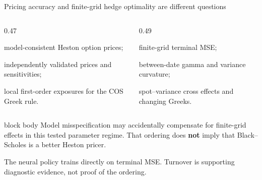 \begin{frame}[t]{\large Pricing accuracy and finite-grid hedge optimality are different questions}
  \begin{columns}[T,onlytextwidth]
    \begin{column}{0.47\textwidth}
      \begin{tightitemize}
        \item model-consistent Heston option prices;
        \item independently validated prices and sensitivities;
        \item local first-order exposures for the COS Greek rule.
      \end{tightitemize}
    \end{column}
    \begin{column}{0.49\textwidth}
      \begin{tightitemize}
        \item finite-grid terminal MSE;
        \item between-date gamma and variance curvature;
        \item spot--variance cross effects and changing Greeks.
      \end{tightitemize}
    \end{column}
  \end{columns}
  \vspace{0.16cm}
  \begin{beamercolorbox}[rounded=true,sep=0.16cm]{block body}
    \small Model misspecification may accidentally compensate for finite-grid effects in this tested parameter regime. That ordering does \textbf{not} imply that Black--Scholes is a better Heston pricer.
  \end{beamercolorbox}
  \vspace{0.12cm}
  {\small The neural policy trains directly on terminal MSE. Turnover is supporting diagnostic evidence, not proof of the ordering.}
\end{frame}

